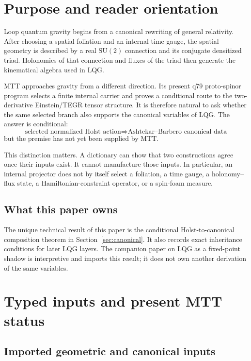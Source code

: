 \documentclass[11pt]{article}
\theoremstyle{plain}
\newcommand{\SU}{\mathrm{SU}(2)}
\begin{document}
\tableofcontents

\section{Purpose and reader orientation}

Loop quantum gravity begins from a canonical rewriting of general relativity.
After choosing a spatial foliation and an internal time gauge, the spatial
geometry is described by a real \(\SU\) connection and its conjugate
densitized triad. Holonomies of that connection and fluxes of the triad then
generate the kinematical algebra used in LQG.

MTT approaches gravity from a different direction. Its present q79
proto-spinor program selects a finite internal carrier and proves a
conditional route to the two-derivative Einstein/TEGR tensor structure. It is
therefore natural to ask whether the same selected branch also supports the
canonical variables of LQG. The answer is conditional:
\[
\boxed{
 \text{selected normalized Holst action}
 \Longrightarrow
 \text{Ashtekar--Barbero canonical data}
}
\]
but the premise has not yet been supplied by MTT.

This distinction matters. A dictionary can show that two constructions agree
once their inputs exist. It cannot manufacture those inputs. In particular,
an internal projector does not by itself select a foliation, a time gauge, a
holonomy--flux state, a Hamiltonian-constraint operator, or a spin-foam
measure.

\subsection{What this paper owns}

The unique technical result of this paper is the conditional
Holst-to-canonical composition theorem in Section~\ref{sec:canonical}. It also
records exact inheritance conditions for later LQG layers. The companion
paper on LQG as a fixed-point shadow is interpretive and imports this result;
it does not own another derivation of the same variables.

\section{Typed inputs and present MTT status}
\label{sec:inputs}

\subsection{Imported geometric and canonical inputs}
\end{document}
